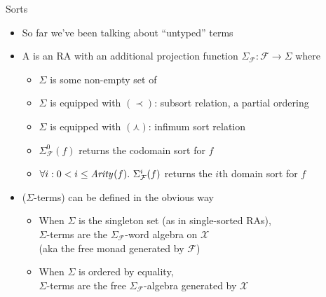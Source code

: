 \documentclass[pdf,fyma2]{prosper} %
\newcommand{\var}[1]{\ensuremath{\text{\textrm{\textit{#1}}}}}
\newcommand{\ARITY}[1][]{\ensuremath{\var{Arity}_{#1}}}
\begin{document}
\begin{slide}{Sorts}
	\begin{itemize}
    \item So far we've been talking about ``untyped'' terms
    \item A  is an RA with an additional projection function $\Sigma_\mathcal{F} : \mathcal{F} \to \Sigma$ where
    	\begin{itemize}
        \item $\Sigma$ is some non-empty set of 
        \item $\Sigma$ is equipped with $(\prec)$: subsort relation, a partial ordering
        \item $\Sigma$ is equipped with $(\curlywedge)$: infimum sort relation
        \item $\Sigma_\mathcal{F}^0(f)$ returns the codomain sort for $f$
        \item $\forall i : 0 < i \leq \ARITY(f).~ \Sigma_\mathcal{F}^i(f)$ returns the $i$th domain sort for $f$
        \end{itemize}
    \item {} ($\Sigma$-terms) can be defined in the obvious way
    	\begin{itemize}
        \item When $\Sigma$ is the singleton set (as in single-sorted RAs),
            \\ $\Sigma$-terms are the $\Sigma_\mathcal{F}$-word algebra on $\mathcal{X}$
            \\ (aka the free monad generated by $\mathcal{F}$)
        \item When $\Sigma$ is ordered by equality,
            \\ $\Sigma$-terms are the free $\Sigma_\mathcal{F}$-algebra generated by $\mathcal{X}$
        \end{itemize}
	\end{itemize}
\end{slide}
\end{document}
